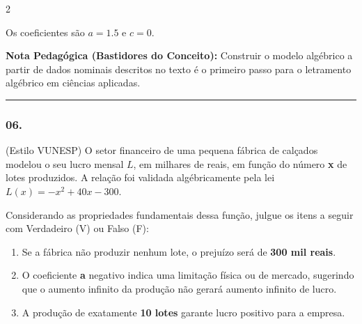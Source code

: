 \begin{multicols*}{2}
\begin{tcolorbox}[colback=CorTitUm!5, colframe=CorTitUm, boxrule=1pt, arc=4pt, left=6pt, right=6pt, top=6pt, bottom=6pt]
    Os coeficientes são $a = 1.5$ e $c = 0$.
    \end{tcolorbox}
    \vspace{0.15cm}
    
    \begin{boxexplicacao}
    \textbf{Nota Pedagógica (Bastidores do Conceito):} Construir o modelo algébrico a partir de dados nominais descritos no texto é o primeiro passo para o letramento algébrico em ciências aplicadas.
    \end{boxexplicacao}
\fi

\par\vspace{\espacoQuestao}

\noindent\textcolor{CorLinha}{\rule{\linewidth}{0.5pt}} 
\par\vspace{\espacoPreQuestao}
\subsubsection*{06.} 
\begin{enunciadoLiteral}
(Estilo VUNESP) O setor financeiro de uma pequena fábrica de calçados modelou o seu lucro mensal $L$, em milhares de reais, em função do número \textbf{x} de lotes produzidos. A relação foi validada algébricamente pela lei $L(x) = -x^2 + 40x - 300$.

Considerando as propriedades fundamentais dessa função, julgue os itens a seguir com Verdadeiro (V) ou Falso (F):

\begin{enumerate}[label=\Roman*.]
    \item Se a fábrica não produzir nenhum lote, o prejuízo será de \textbf{300 mil reais}.
    \item O coeficiente \textbf{a} negativo indica uma limitação física ou de mercado, sugerindo que o aumento infinito da produção não gerará aumento infinito de lucro.
    \item A produção de exatamente \textbf{10 lotes} garante lucro positivo para a empresa.
\end{enumerate}
\end{enunciadoLiteral}


\end{multicols*}
